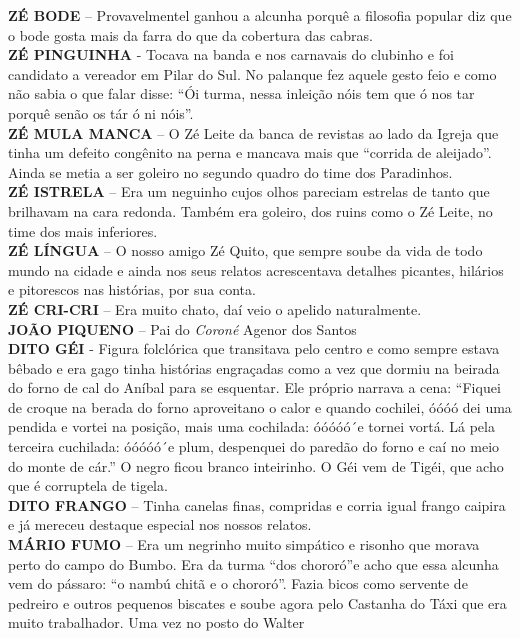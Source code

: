 \documentclass[12pt,brazil,]{book}
\begin{document}
\textbf{ZÉ BODE} -- Provavelmentel ganhou a alcunha porquê a filosofia
popular diz que o bode gosta mais da farra do que da cobertura das
cabras.\\
\textbf{ZÉ PINGUINHA} - Tocava na banda e nos carnavais do clubinho e
foi candidato a vereador em Pilar do Sul. No palanque fez aquele gesto
feio e como não sabia o que falar disse: ``Ói turma, nessa inleição nóis
tem que ó nos tar porquê senão os tár ó ni nóis''.\\
\textbf{ZÉ MULA MANCA} -- O Zé Leite da banca de revistas ao lado da
Igreja que tinha um defeito congênito na perna e mancava mais que
``corrida de aleijado''. Ainda se metia a ser goleiro no segundo quadro
do time dos Paradinhos.\\
\textbf{ZÉ ISTRELA} -- Era um neguinho cujos olhos pareciam estrelas de
tanto que brilhavam na cara redonda. Também era goleiro, dos ruins como
o Zé Leite, no time dos mais inferiores.\\
\textbf{ZÉ LÍNGUA} -- O nosso amigo Zé Quito, que sempre soube da vida
de todo mundo na cidade e ainda nos seus relatos acrescentava detalhes
picantes, hilários e pitorescos nas histórias, por sua conta.\\
\textbf{ZÉ CRI-CRI} -- Era muito chato, daí veio o apelido
naturalmente.\\
\textbf{JOÃO PIQUENO} -- Pai do \emph{Coroné} Agenor dos Santos\\
\textbf{DITO GÉI} - Figura folclórica que transitava pelo centro e como
sempre estava bêbado e era gago tinha histórias engraçadas como a vez
que dormiu na beirada do forno de cal do Aníbal para se esquentar. Ele
próprio narrava a cena: ``Fiquei de croque na berada do forno
aproveitano o calor e quando cochilei, óóóó dei uma pendida e vortei na
posição, mais uma cochilada: óóóóó´e tornei vortá. Lá pela terceira
cuchilada: óóóóó´e plum, despenquei do paredão do forno e caí no meio do
monte de cár.'' O negro ficou branco inteirinho. O Géi vem de Tigéi, que
acho que é corruptela de tigela.\\
\textbf{DITO FRANGO} -- Tinha canelas finas, compridas e corria igual
frango caipira e já mereceu destaque especial nos nossos relatos.\\
\textbf{MÁRIO FUMO} -- Era um negrinho muito simpático e risonho que
morava perto do campo do Bumbo. Era da turma ``dos chororó''e acho que
essa alcunha vem do pássaro: ``o nambú chitã e o chororó''. Fazia bicos
como servente de pedreiro e outros pequenos biscates e soube agora pelo
Castanha do Táxi que era muito trabalhador. Uma vez no posto do Walter
\end{document}
